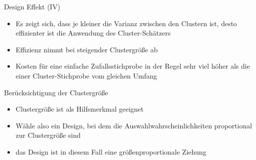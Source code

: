 \documentclass[9pt]{beamer}
\begin{document}
\begin{frame}{Design Effekt (IV)}
\begin{itemize}
\item Es zeigt sich, dass je kleiner die Varianz zwischen den Clustern
ist, desto effizienter ist die Anwendung des Cluster-Schätzers
\item Effizienz nimmt bei steigender Clustergröße ab 
\item Kosten für eine einfache Zufallsstichprobe in der Regel sehr viel höher als die einer Cluster-Stichprobe vom gleichen Umfang
\end{itemize}
\end{frame}

\begin{frame}{Berücksichtigung der Clustergröße}
\begin{itemize}
\item Clustergröße ist als Hilfsmerkmal geeignet
\item Wähle also ein Design, bei dem die Auswahlwahrscheinlichkeiten proportional zur Clustergröße sind
\item das Design ist in diesem Fall eine größenproportionale Ziehung
\end{itemize}
\end{frame}
\end{document}
